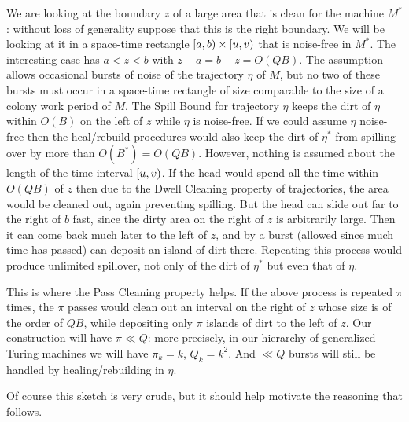 \documentclass[12pt]{memoir}
\def\B{B}
\newcommand{\Q}{Q}
\begin{document}
We are looking at the boundary \( z \) of a large area that is clean for the
machine \( M^{*} \): without loss of generality suppose that this is the right boundary.
We will be looking at it in a space-time rectangle \( \left[a,b\right)\times\left[u,v\right) \)
that is noise-free in \( M^{*} \).
The interesting case has \( a<z<b \) with \( z-a=b-z=O(\Q\B) \).
The assumption allows occasional bursts of noise of the trajectory \( \eta \) of \( M \),
but no two of these bursts must occur in a space-time rectangle of size comparable to
the size of a colony work period of \( M \).
The Spill Bound for trajectory \( \eta \) keeps the dirt of \( \eta \) within
\( O(\B) \) on the left of \( z \) while \( \eta \) is noise-free.
If we could assume \( \eta \) noise-free then the heal/rebuild procedures would also keep
the dirt of \( \eta^{*} \) from spilling over by more than \( O(\B^{*})=O(\Q\B) \).
However, nothing is assumed about the length of the time interval \( \left[u,v\right) \).
If the head would spend all the time within \( O(\Q\B) \) of \( z \) then due to 
the Dwell Cleaning property of trajectories,  the area would be cleaned out, again
preventing spilling.
But the head can slide out far to the right of \( b \) fast, since
the dirty area on the right of \( z \) is arbitrarily large.
Then it can come back much later to the left of \( z \), and by
a burst (allowed since much time has passed)
can deposit an island of dirt there.
Repeating this process would produce unlimited spillover, not only 
of the dirt of \( \eta^{*} \) but even that of \( \eta \).

This is where the Pass Cleaning property helps.
If the above process is repeated \( \pi \) times, the \( \pi \) passes
would clean out an interval on the
right of \( z \) whose size is of the order of \( \Q\B \),
while depositing only \( \pi \) islands of dirt to the left of \( z \).
Our construction will have \( \pi\ll \Q \): more precisely, in our hierarchy
of generalized Turing machines we will have \( \pi_{k}=k \), \( \Q_{k}=k^{2} \). %
And \( \ll \Q \) bursts will still be handled by healing/rebuilding in \( \eta \).

Of course this sketch is very crude, but it should help motivate the reasoning that
follows.





\end{document}
